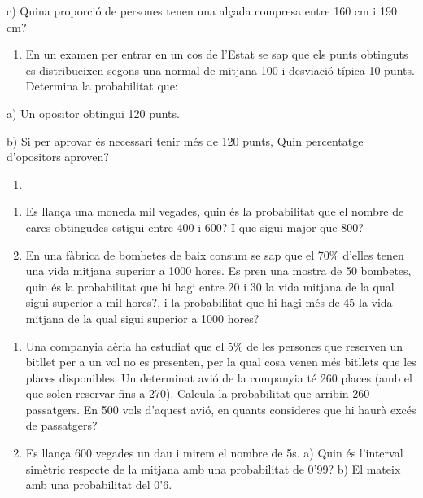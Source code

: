 c) Quina proporció de persones tenen una alçada compresa entre 160 cm i
190 cm?

\begin{enumerate}
\def\labelenumi{\arabic{enumi}.}
\tightlist
\item
  En un examen per entrar en un cos de l'Estat se sap que els punts
  obtinguts es distribueixen segons una normal de mitjana 100 i
  desviació típica 10 punts. Determina la probabilitat que:
\end{enumerate}

a) Un opositor obtingui 120 punts.

b) Si per aprovar és necessari tenir més de 120 punts, Quin percentatge
d'opositors aproven?

\begin{enumerate}
\def\labelenumi{\arabic{enumi}.}
\item
\end{enumerate}

\begin{enumerate}
\def\labelenumi{\arabic{enumi}.}
\tightlist
\item
  Es llança una moneda mil vegades, quin és la probabilitat que el
  nombre de cares obtingudes estigui entre 400 i 600? I que sigui major
  que 800?
\item
  En una fàbrica de bombetes de baix consum se sap que el 70\% d'elles
  tenen una vida mitjana superior a 1000 hores. Es pren una mostra de 50
  bombetes, quin és la probabilitat que hi hagi entre 20 i 30 la vida
  mitjana de la qual sigui superior a mil hores?, i la probabilitat que
  hi hagi més de 45 la vida mitjana de la qual sigui superior a 1000
  hores?
\end{enumerate}

\begin{enumerate}
\def\labelenumi{\arabic{enumi}.}
\tightlist
\item
  Una companyia aèria ha estudiat que el 5\% de les persones que
  reserven un bitllet per a un vol no es presenten, per la qual cosa
  venen més bitllets que les places disponibles. Un determinat avió de
  la companyia té 260 places (amb el que solen reservar fins a 270).
  Calcula la probabilitat que arribin 260 passatgers. En 500 vols
  d'aquest avió, en quants consideres que hi haurà excés de passatgers? 
\item
  Es llança 600 vegades un dau i mirem el nombre de 5s. a) Quin és
  l'interval simètric respecte de la mitjana amb una probabilitat de
  0'99? b) El mateix amb una probabilitat del 0'6. 
\end{enumerate}

